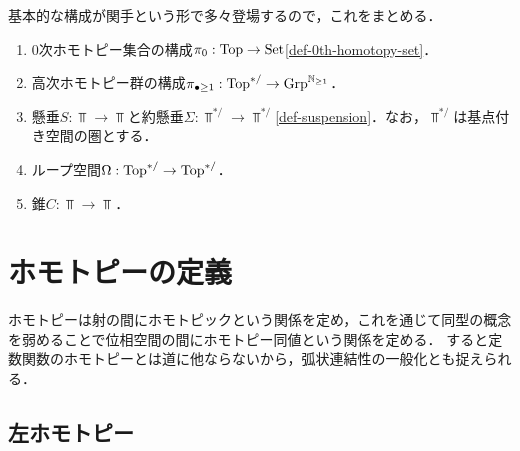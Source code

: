 \documentclass[uplatex,dvipdfmx]{jsreport}
\begin{document}
\begin{notation}[関手]
    基本的な構成が関手という形で多々登場するので，これをまとめる．
    \begin{enumerate}
        \item $0$次ホモトピー集合の構成$\pi_0:\mathrm{Top}\to\mathrm{Set}$\ref{def-0th-homotopy-set}．
        \item 高次ホモトピー群の構成$\pi_{\bullet\ge1}:\mathrm{Top}^{*/}\to\mathrm{Grp}^{\mathbb{N}_{\ge1}}$．
        \item 懸垂$S:\Top\to\Top$と約懸垂$\Sigma:\Top^{*/}\to\Top^{*/}$\ref{def-suspension}．なお，$\Top^{*/}$は基点付き空間の圏とする．
        \item ループ空間$\Omega:\mathrm{Top}^{*/}\to\mathrm{Top}^{*/}$．
        \item 錐$C:\Top\to\Top$．
    \end{enumerate}
\end{notation}

\section{ホモトピーの定義}

\begin{tcolorbox}[colframe=ForestGreen, colback=ForestGreen!10!white,breakable,colbacktitle=ForestGreen!40!white,coltitle=black,fonttitle=\bfseries\sffamily,
    title=]
    ホモトピーは射の間にホモトピックという関係を定め，これを通じて同型の概念を弱めることで位相空間の間にホモトピー同値という関係を定める．
    すると定数関数のホモトピーとは道に他ならないから，弧状連結性の一般化とも捉えられる．
\end{tcolorbox}

\subsection{左ホモトピー}
\end{document}
